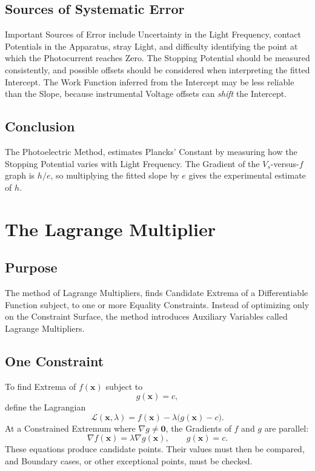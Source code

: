 \documentclass[a4paper, 10pt, onepage]{elegantbook}
\begin{document}
\subsection{Sources of Systematic Error}

Important Sources of Error include Uncertainty in the Light Frequency, contact Potentials in the Apparatus, stray Light, and difficulty identifying the point at which the Photocurrent reaches Zero. The Stopping Potential should be measured consistently, and possible offsets should be considered when interpreting the fitted
Intercept. The Work Function inferred from the Intercept may be less reliable than the Slope, because instrumental Voltage offsets can \emph{shift} the Intercept.

\subsection{Conclusion}

The Photoelectric Method, estimates Plancks' Constant by measuring how
the Stopping Potential varies with Light Frequency. The Gradient of the \(V_s\)-versus-\(f\) graph is \(h/e\), so multiplying the fitted
slope by \(e\) gives the experimental estimate of \(h\).







\section{The Lagrange Multiplier}

\subsection{Purpose}

The method of Lagrange Multipliers, finds Candidate Extrema of a Differentiable Function subject, to one or more Equality Constraints. Instead of optimizing only on the Constraint Surface, the method introduces Auxiliary Variables called Lagrange Multipliers.

\subsection{One Constraint}

To find Extrema of \(f(\mathbf{x})\) subject to
\[
g(\mathbf{x})=c,
\]
define the Lagrangian
\[
\mathcal{L}(\mathbf{x},\lambda)
=f(\mathbf{x})-\lambda\bigl(g(\mathbf{x})-c\bigr).
\]
At a Constrained Extremum where \(\nabla g\ne\mathbf{0}\), the
Gradients of \(f\) and \(g\) are parallel:
\[
\boxed{
\nabla f(\mathbf{x})=\lambda\nabla g(\mathbf{x}),
\qquad
g(\mathbf{x})=c.
}
\]
These equations produce candidate points. Their values must then be compared, and Boundary cases, or other exceptional points, must be checked.
\end{document}
